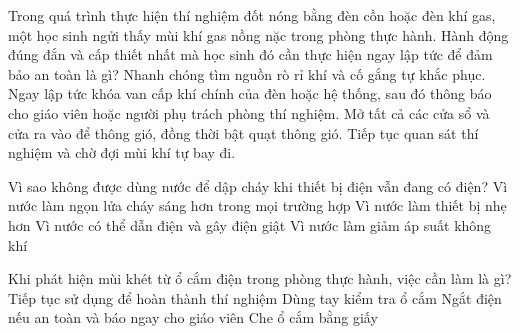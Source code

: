 \begin{ex}
Trong quá trình thực hiện thí nghiệm đốt nóng bằng đèn cồn hoặc đèn khí gas, một học sinh ngửi thấy mùi khí gas nồng nặc trong phòng thực hành. Hành động đúng đắn và cấp thiết nhất mà học sinh đó cần thực hiện ngay lập tức để đảm bảo an toàn là gì?
\choice
{Nhanh chóng tìm nguồn rò rỉ khí và cố gắng tự khắc phục.}
{\True Ngay lập tức khóa van cấp khí chính của đèn hoặc hệ thống, sau đó thông báo cho giáo viên hoặc người phụ trách phòng thí nghiệm.}
{Mở tất cả các cửa sổ và cửa ra vào để thông gió, đồng thời bật quạt thông gió.}
{Tiếp tục quan sát thí nghiệm và chờ đợi mùi khí tự bay đi.}
\end{ex}

\begin{ex}
Vì sao không được dùng nước để dập cháy khi thiết bị điện vẫn đang có điện?
\choice
{Vì nước làm ngọn lửa cháy sáng hơn trong mọi trường hợp}
{Vì nước làm thiết bị nhẹ hơn}
{\True Vì nước có thể dẫn điện và gây điện giật}
{Vì nước làm giảm áp suất không khí}
\end{ex}

\begin{ex}
Khi phát hiện mùi khét từ ổ cắm điện trong phòng thực hành, việc cần làm là gì?
\choice
{Tiếp tục sử dụng để hoàn thành thí nghiệm}
{Dùng tay kiểm tra ổ cắm}
{\True Ngắt điện nếu an toàn và báo ngay cho giáo viên}
{Che ổ cắm bằng giấy}
\end{ex}

